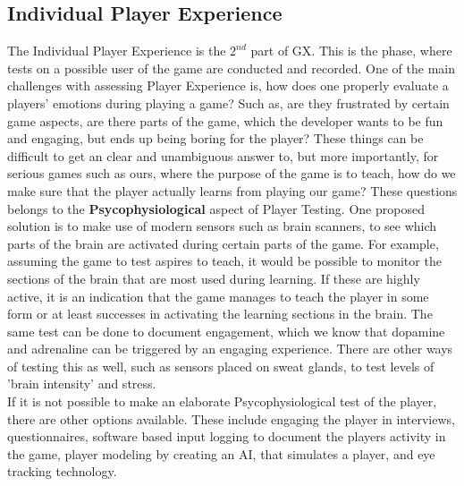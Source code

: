 \subsection{Individual Player Experience}
The Individual Player Experience is the $2^{nd}$ part of GX.
This is the phase, where tests on a possible user of the game are conducted and recorded.
One of the main challenges with assessing Player Experience is, how does one properly evaluate a players' emotions during playing a game?
Such as, are they frustrated by certain game aspects, are there parts of the game, which the developer wants to be fun and engaging, but ends up being boring for the player?
These things can be difficult to get an clear and unambiguous answer to, but more importantly, for serious games such as ours, where the purpose of the game is to teach, how do we make sure that the player actually learns from playing our game?
These questions belongs to the \textbf{Psycophysiological} aspect of Player Testing.
One proposed solution is to make use of modern sensors such as brain scanners, to see which parts of the brain are activated during certain parts of the game.
For example, assuming the game to test aspires to teach, it would be possible to monitor the sections of the brain that are most used during learning.
If these are highly active, it is an indication that the game manages to teach the player in some form or at least successes in activating the learning sections in the brain.
The same test can be done to document engagement, which we know that dopamine and adrenaline can be triggered by an engaging experience.
There are other ways of testing this as well, such as sensors placed on sweat glands, to test levels of 'brain intensity' and stress.\\

If it is not possible to make an elaborate Psycophysiological test of the player, there are other options available.
These include engaging the player in interviews, questionnaires, software based input logging to document the players activity in the game, player modeling by creating an AI, that simulates a player, and eye tracking technology.


